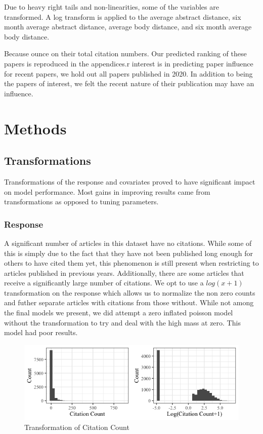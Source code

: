 \documentclass{article} %
\begin{document}
Due to heavy right tails and non-linearities, some of the variables are transformed. A log transform is applied to the average abstract distance, six month average abstract distance, average body distance, and six month average body distance.

Because ounce on their total citation numbers. Our predicted ranking of these papers is reproduced in the appendices.r interest is in predicting paper influence for recent papers, we hold out all papers published in 2020. In addition to being the papers of interest, we felt the recent nature of their publication may have an influence.



\section{Methods}
\label{others}


\subsection{Transformations}
Transformations of the response and covariates proved to have significant impact on model performance. Most gains in improving results came from transformations as opposed to tuning parameters.

\subsubsection{Response}
A significant number of articles in this dataset have no citations. While some of this is simply due to the fact that they have not been published long enough for others to have cited them yet, this phenomenon is still present when restricting to articles published in previous years. Additionally, there are some articles that receive a significantly large number of citations. We opt to use a $log(x+1)$ transformation on the response which allows us to normalize the non zero counts and futher separate articles with citations from those without. While not among the final models we present, we did attempt a zero inflated poisson model without the transformation to try and deal with the high mass at zero. This model had poor results.


\begin{figure}[h]
\begin{center}
\includegraphics[scale=0.5]{../Figures/citation_hist.png} 
\end{center}
\caption{Transformation of Citation Count}
\end{figure}
\end{document}
